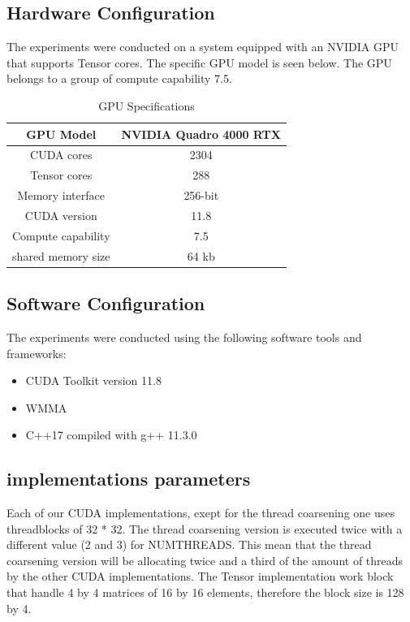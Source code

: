 \documentclass[conference]{IEEEtran}
\begin{document}
  \subsection{Hardware Configuration}\label{sec:hardware-configuration}
  
  The experiments were conducted on a system equipped with an NVIDIA GPU that supports Tensor cores.
  The specific GPU model is seen below. The GPU belongs to a group of compute capability 7.5. 
  
  \begin{table}[htbp]
  \caption{GPU Specifications\cite{Voltatuningguide}}
  \centering
    \begin{tabular}{|c|c|}
    \hline
    GPU Model & NVIDIA Quadro 4000 RTX \\
    \hline
    CUDA cores & 2304 \\
    \hline
    Tensor cores & 288 \\
    \hline
    Memory interface & 256-bit \\
    \hline
    CUDA version & 11.8 \\
    \hline
    Compute capability & 7.5 \\
    \hline
    shared memory size & 64 kb \\
    \hline
    
  \end{tabular}
  \end{table}
  
  \subsection{Software Configuration}\label{sec:software-configuration}
  
  The experiments were conducted using the following software tools and frameworks:
  
  \begin{itemize}
    \item CUDA Toolkit version 11.8
    \item WMMA
    \item C++17 compiled with g++ 11.3.0
  \end{itemize}
  \subsection{implementations parameters}
  Each of our CUDA implementations, exept for the thread coarsening one uses threadblocks of 32 * 32.
  The thread coarsening version is executed twice with a different value (2 and 3) for NUMTHREADS. This
  mean that the thread coarsening version will be allocating twice and a third of the amount of threads
  by the other CUDA implementations. The Tensor implementation work block that handle 4 by 4 matrices of
  16 by 16 elements, therefore the block size is 128 by 4.
\end{document}

